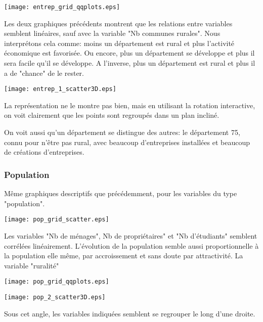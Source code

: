 \documentclass[a4paper,11pt]{article}
\begin{document}
\begin{center}
\texttt{[image: entrep\_grid\_qqplots.eps]}
\end{center}
Les deux graphiques précédents montrent que les relations entre variables semblent linéaires, sauf avec la variable "Nb communes rurales".
Nous interprétons cela comme: moins un département est rural et plus l'activité économique est favorisée.
Ou encore, plus un département se développe et plus il sera facile qu'il se développe.
A l'inverse, plus un département est rural et plus il a de "chance" de le rester.



\begin{center}
\texttt{[image: entrep\_1\_scatter3D.eps]}
\end{center}
La représentation ne le montre pas bien, mais en utilisant la rotation interactive, on voit clairement que les points sont regroupés dans un plan incliné.

On voit aussi qu'un département se distingue des autres: le département 75, connu pour n'être pas rural, avec beaucoup d'entreprises installées et beaucoup de créations d'entreprises.


\subsubsection{Population}
Même graphiques descriptifs que précédemment, pour les variables du type "population".
\begin{center}
\texttt{[image: pop\_grid\_scatter.eps]}
\end{center}
Les variables "Nb de ménages", Nb de propriétaires" et "Nb d'étudiants" semblent corrélées linéairement.
L'évolution de la population semble aussi proportionnelle à la population elle même, par accroissement et sans doute par attractivité.
La variable "ruralité" 

\begin{center}
\texttt{[image: pop\_grid\_qqplots.eps]}
\end{center}

\begin{center}
\texttt{[image: pop\_2\_scatter3D.eps]}
\end{center}
Sous cet angle, les variables indiquées semblent se regrouper le long d'une droite.
\end{document}
